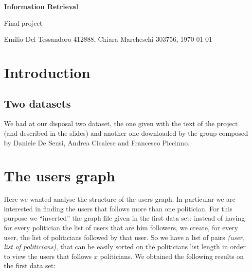 \documentclass[a4paper,11pt,oneside]{article}
\begin{document}
\begin{center}\begin{huge}\textbf{Information Retrieval}\end{huge}
\medskip 

\begin{huge}Final project\end{huge}
\bigskip 

\begin{large}
Emilio Del Tessandoro 412888, Chiara Marcheschi 303756, \today
\end{large}
\end{center}


\section{Introduction}
\label{sec:intro}

\subsection{Two datasets}
We had at our disposal two dataset, the one given with the text of the project (and described in the slides) and another one downloaded by the group composed by Daniele De Sensi, Andrea Cicalese and Francesco Piccinno.


\section{The users graph}
Here we wanted analyse the structure of the users graph. In particular we are interested in finding the users that follows more than one politician. For this purpose we ``inverted'' the graph file given in the first data set: instead of having for every politician the list of users that are him followers, we create, for every user, the list of politicians followed by that user.
So we have a list of pairs \textit{(user, list of politicians)}, that can be easily sorted on the politicians list length in order to view the users that follows $x$ politicians. We obtained the following results on the first data set:
\end{document}
